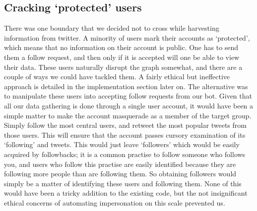 \subsection{Cracking `protected' users}
There was one boundary that we decided not to cross while harvesting information from twitter. A minority of users mark their accounts as `protected', which means that no information on their account is public. One has to send them a follow request, and then only if it is accepted will one be able to view their data. These users naturally disrupt the graph somewhat, and there are a couple of ways we could have tackled them. A fairly ethical but ineffective approach is detailed in the implementation section later on. The alternative was to manipulate these users into accepting follow requests from our bot. Given that all our data gathering is done through a single user account, it would have been a simple matter to make the account masquerade as a member of the target group. Simply follow the most central users, and retweet the most popular tweets from those users. This will ensure that the account passes cursory examination of its `following' and tweets. This would just leave `followers' which would be easily acquired by followbacks; it is a common practise to follow someone who follows you, and users who follow this  practise are easily identified because they are following more people than are following them. So obtaining followers would simply be a matter of identifying these users and following them. None of this would have been a tricky addition to the existing code, but the not insignificant ethical concerns of automating impersonation on this scale prevented us.






